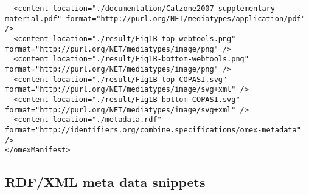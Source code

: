 \begin{mdframed}[style=mddefault,frametitle={The \texttt{manifest.xml} of the final COMBINE archive}]
\begin{verbatim}
  <content location="./documentation/Calzone2007-supplementary-material.pdf" format="http://purl.org/NET/mediatypes/application/pdf" />
  <content location="./result/Fig1B-top-webtools.png" format="http://purl.org/NET/mediatypes/image/png" />
  <content location="./result/Fig1B-bottom-webtools.png" format="http://purl.org/NET/mediatypes/image/png" />
  <content location="./result/Fig1B-top-COPASI.svg" format="http://purl.org/NET/mediatypes/image/svg+xml" />
  <content location="./result/Fig1B-bottom-COPASI.svg" format="http://purl.org/NET/mediatypes/image/svg+xml" />
  <content location="./metadata.rdf" format="http://identifiers.org/combine.specifications/omex-metadata" />
</omexManifest>
\end{verbatim}
\end{mdframed}


\subsection{RDF/XML meta data snippets}
\label{sec:rdfmeta}
